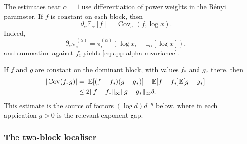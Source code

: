 \documentclass[aps,pra,11pt,onecolumn,nofootinbib,tightenlines]{revtex4-2}
\theoremstyle{definition}
\begin{document}
The estimates near $\alpha=1$ use differentiation of power weights in the R\'enyi parameter.  If $f$ is constant on each block, then
\begin{equation}
 \partial_\alpha\mathbb E_\alpha[f]
 =\operatorname{Cov}_\alpha(f,\log x).
 \label{eq:app-alpha-covariance}
\end{equation}
Indeed,
\begin{equation}
 \partial_\alpha\pi_i^{(\alpha)}
 =\pi_i^{(\alpha)}
 \left(\log x_i-\mathbb E_\alpha[\log x]\right),
 \label{eq:app-pi-alpha-derivative}
\end{equation}
and summation against $f_i$ yields \eqref{eq:app-alpha-covariance}.

If $f$ and $g$ are constant on the dominant block, with values $f_*$ and $g_*$ there, then
\begin{align}
 |\operatorname{Cov}(f,g)|
 &=\left|
 \mathbb E[(f-f_*)(g-g_*)]
 -\mathbb E[f-f_*]\mathbb E[g-g_*]
 \right|
 \notag\\
 &\leq2\|f-f_*\|_\infty
       \|g-g_*\|_\infty\delta.
 \label{eq:app-covariance-concentration}
\end{align}
This estimate is the source of factors $(\log d)d^{-g}$ below, where in each
application $g>0$ is the relevant exponent gap.

\subsubsection{The two-block localiser}
\label{app:two-block-localisation}
\end{document}

